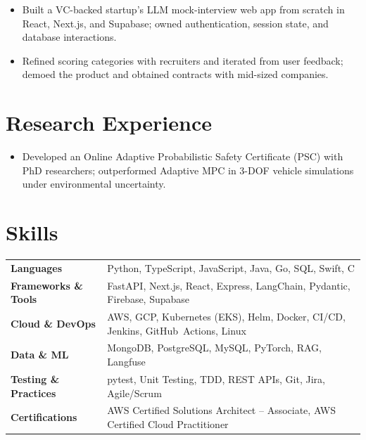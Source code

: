 \documentclass[11pt, letterpaper]{article}
\begin{document}
\vspace{1pt}
\begin{itemize}
  \item Built a VC-backed startup's LLM mock-interview web app from scratch in React, Next.js, and Supabase; owned authentication, session state, and database interactions.
  \item Refined scoring categories with recruiters and iterated from user feedback; demoed the product and obtained contracts with mid-sized companies.
\end{itemize}

\section{Research Experience}
\begin{itemize}
  \item Developed an Online Adaptive Probabilistic Safety Certificate (PSC) with PhD researchers; outperformed Adaptive MPC in 3-DOF vehicle simulations under environmental uncertainty.
\end{itemize}

\section{Skills}
\begin{tabularx}{\textwidth}{@{}l @{\hspace{7pt}} >{\raggedright\arraybackslash}X@{}}
  \textbf{Languages} & Python, TypeScript, JavaScript, Java, Go, SQL, Swift, C \\[1pt]
  \textbf{Frameworks \& Tools} & FastAPI, Next.js, React, Express, LangChain, Pydantic, Firebase, Supabase \\[1pt]
  \textbf{Cloud \& DevOps} & AWS, GCP, Kubernetes (EKS), Helm, Docker, CI/CD, Jenkins, GitHub~Actions, Linux \\[1pt]
  \textbf{Data \& ML} & MongoDB, PostgreSQL, MySQL, PyTorch, RAG, Langfuse \\[1pt]
  \textbf{Testing \& Practices} & pytest, Unit Testing, TDD, REST APIs, Git, Jira, Agile/Scrum \\[1pt]
  \textbf{Certifications} & AWS Certified Solutions Architect -- Associate, AWS Certified Cloud Practitioner \\
\end{tabularx}
\end{document}
